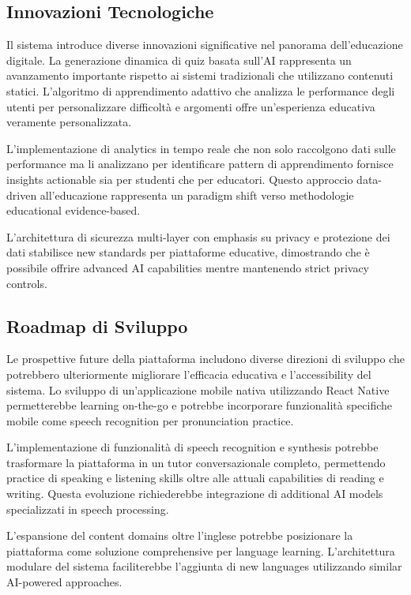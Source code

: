 \documentclass[12pt,a4paper]{article}
\begin{document}
\subsection{Innovazioni Tecnologiche}

Il sistema introduce diverse innovazioni significative nel panorama dell'educazione digitale. La generazione dinamica di quiz basata sull'AI rappresenta un avanzamento importante rispetto ai sistemi tradizionali che utilizzano contenuti statici. L'algoritmo di apprendimento adattivo che analizza le performance degli utenti per personalizzare difficoltà e argomenti offre un'esperienza educativa veramente personalizzata.

L'implementazione di analytics in tempo reale che non solo raccolgono dati sulle performance ma li analizzano per identificare pattern di apprendimento fornisce insights actionable sia per studenti che per educatori. Questo approccio data-driven all'educazione rappresenta un paradigm shift verso methodologie educational evidence-based.

L'architettura di sicurezza multi-layer con emphasis su privacy e protezione dei dati stabilisce new standards per piattaforme educative, dimostrando che è possibile offrire advanced AI capabilities mentre mantenendo strict privacy controls.

\subsection{Roadmap di Sviluppo}

Le prospettive future della piattaforma includono diverse direzioni di sviluppo che potrebbero ulteriormente migliorare l'efficacia educativa e l'accessibility del sistema. Lo sviluppo di un'applicazione mobile nativa utilizzando React Native permetterebbe learning on-the-go e potrebbe incorporare funzionalità specifiche mobile come speech recognition per pronunciation practice.

L'implementazione di funzionalità di speech recognition e synthesis potrebbe trasformare la piattaforma in un tutor conversazionale completo, permettendo practice di speaking e listening skills oltre alle attuali capabilities di reading e writing. Questa evoluzione richiederebbe integrazione di additional AI models specializzati in speech processing.

L'espansione del content domains oltre l'inglese potrebbe posizionare la piattaforma come soluzione comprehensive per language learning. L'architettura modulare del sistema faciliterebbe l'aggiunta di new languages utilizzando similar AI-powered approaches.
\end{document}
